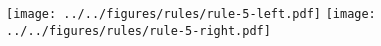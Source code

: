\documentclass[varwidth]{standalone}
\begin{document}
\texttt{[image: ../../figures/rules/rule-5-left.pdf]}
\texttt{[image: ../../figures/rules/rule-5-right.pdf]}
\end{document}
